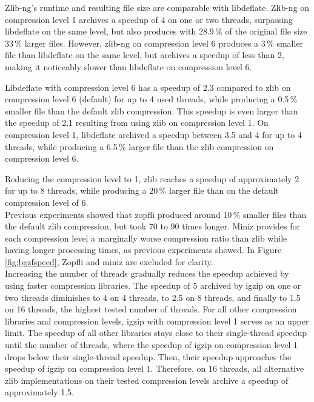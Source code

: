 Zlib-ng's runtime and resulting file size are comparable with libdeflate. Zlib-ng on compression level 1 archives a speedup of 4 on one or two threads, surpassing libdeflate on the same level, but also produces with 28.9\,\% of the original file size 33\,\% larger files. However, zlib-ng on compression level 6 produces a 3\,\% smaller file than libdeflate on the same level, but archives a speedup of less than 2, making it noticeably slower than libdeflate on compression level 6. 

Libdeflate with compression level 6 has a speedup of 2.3 compared to zlib on compression level 6 (default) for up to 4 used threads, while producing a 0.5\,\% smaller file than the default zlib compression. This speedup is even larger than the speedup of 2.1 resulting from using zlib on compression level 1. On compression level 1, libdeflate archived a speedup between 3.5 and 4 for up to 4 threads, while producing a 6.5\,\% larger file than the zlib compression on compression level 6.

Reducing the compression level to 1, zlib reaches a speedup of approximately 2 for up to 8 threads, while producing a 20\,\% larger file than on the default compression level of 6.\\

Previous experiments showed that zopfli produced around 10\,\% smaller files than the default zlib compression, but took 70 to 90 times longer.   
Miniz provides for each compression level a marginally worse compression ratio than zlib while having longer processing times, as previous experiments showed. In Figure \ref{fig:bgzfspeed}, Zopfli and miniz are excluded for clarity.\\

Increasing the number of threads gradually reduces the speedup achieved by using faster compression libraries. The speedup of 5 archived by igzip on one or two threads diminishes to 4 on 4 threads, to 2.5 on 8 threads, and finally to 1.5 on 16 threads, the highest tested number of threads. For all other compression libraries and compression levels, igzip with compression level 1 serves as an upper limit. The speedup of all other libraries stays close to their single-thread speedup until the number of threads, where the speedup of igzip on compression level 1 drops below their single-thread speedup. Then, their speedup approaches the speedup of igzip on compression level 1. Therefore, on 16 threads, all alternative zlib implementations on their tested compression levels archive a speedup of approximately 1.5. 

